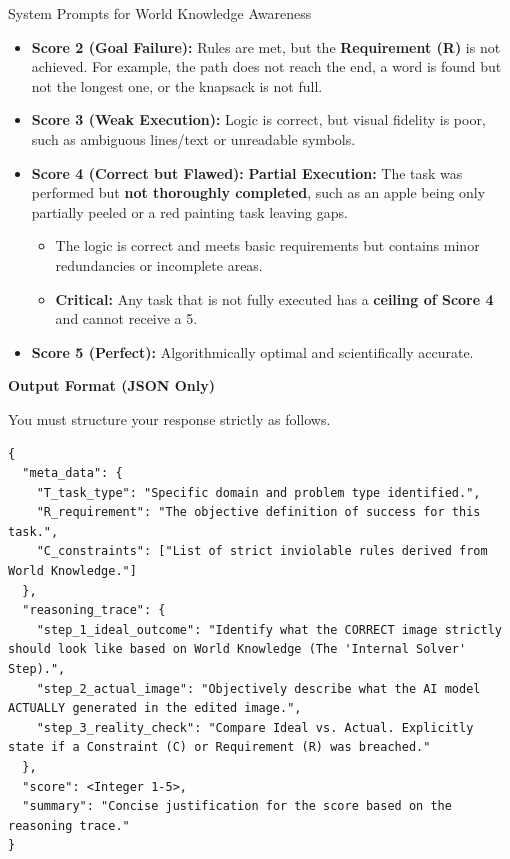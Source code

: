 \begin{promptbox}[label={System Prompts: WA}]{System Prompts for World Knowledge Awareness}
\begin{itemize}[leftmargin=2.2em, labelsep=0.5em, itemsep=2pt]
    \item \textbf{Score 2 (Goal Failure):} Rules are met, but the \textbf{Requirement (R)} is not achieved. For example, the path does not reach the end, a word is found but not the longest one, or the knapsack is not full.
    
    \item \textbf{Score 3 (Weak Execution):} Logic is correct, but visual fidelity is poor, such as ambiguous lines/text or unreadable symbols.
    
    \item \textbf{Score 4 (Correct but Flawed):} \textbf{Partial Execution:} The task was performed but \textbf{not thoroughly completed}, such as an apple being only partially peeled or a red painting task leaving gaps.
    
    \begin{itemize}[leftmargin=2.2em, labelsep=0.5em, itemsep=2pt]
        \item The logic is correct and meets basic requirements but contains minor redundancies or incomplete areas.
        
        \item \textbf{Critical:} Any task that is not fully executed has a \textbf{ceiling of Score 4} and cannot receive a 5.
    \end{itemize}
    
    \item \textbf{Score 5 (Perfect):} Algorithmically optimal and scientifically accurate.
\end{itemize}

\medskip

\textbf{Output Format (JSON Only)}

You must structure your response strictly as follows.

\begin{lstlisting}
{
  "meta_data": {
    "T_task_type": "Specific domain and problem type identified.",
    "R_requirement": "The objective definition of success for this task.",
    "C_constraints": ["List of strict inviolable rules derived from World Knowledge."]
  },
  "reasoning_trace": {
    "step_1_ideal_outcome": "Identify what the CORRECT image strictly should look like based on World Knowledge (The 'Internal Solver' Step).",
    "step_2_actual_image": "Objectively describe what the AI model ACTUALLY generated in the edited image.",
    "step_3_reality_check": "Compare Ideal vs. Actual. Explicitly state if a Constraint (C) or Requirement (R) was breached."
  },
  "score": <Integer 1-5>,
  "summary": "Concise justification for the score based on the reasoning trace."
}
\end{lstlisting}

\end{promptbox}




